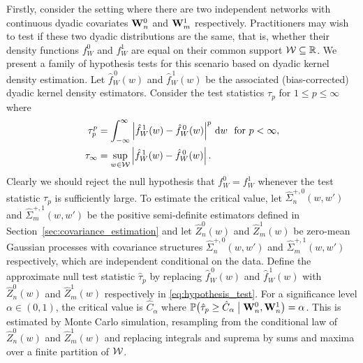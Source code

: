 Firstly, consider the setting where there are two independent networks with
continuous dyadic covariates $\mathbf{W}_n^0$ and $\mathbf{W}_m^1$ respectively.
Practitioners may wish to test if these two dyadic distributions are the same,
that is, whether their density functions $f_W^0$ and $f_W^1$ are equal on their
common support $\mathcal{W} \subseteq \mathbb{R}$. We present a family of hypothesis tests for
this scenario based on dyadic kernel density estimation. Let $\hat
f_W^{\,0}(w)$ and $\hat f_W^{\,1}(w)$ be the associated (bias-corrected) dyadic
kernel density estimators. Consider the test statistics $\tau_p$ for
$1 \leq p \leq \infty$ where
%
\begin{align}
  \nonumber
  \tau_p^p
  &= \int_{-\infty}^{\infty}
  \left| \hat f_W^{\,1}(w) - \hat f_W^{\,0}(w) \right|^p
  \,\mathrm{d}w
  \ \text{ for } p < \infty, \\
  \label{eq:hypothesis_test}
  \tau_\infty
  &= \sup_{w \in \mathcal{W}} \left| \hat f_W^{\,1}(w) - \hat f_W^{\,0}(w) \right|.
\end{align}
%
Clearly we should reject the null hypothesis that $f_W^0 = f_W^1$ whenever the
test statistic $\tau_p$ is sufficiently large. To estimate the critical value,
let $\hat\Sigma_n^{+,0}(w, w')$ and $\hat\Sigma_m^{+,1}(w, w')$ be the positive
semi-definite estimators defined in Section~\ref{sec:covariance_estimation} and
let $\hat Z^0_n(w)$ and $\hat Z^1_m(w)$ be zero-mean Gaussian processes with
covariance structures $\hat\Sigma_n^{+,0}(w, w')$ and
$\hat\Sigma_m^{+,1}(w, w')$ respectively, which are independent conditional on
the data. Define the approximate null test statistic $\hat \tau_p$ by replacing
$\hat f_W^{\,0}(w)$ and $\hat f_W^{\,1}(w)$ with $\hat Z^0_n(w)$ and
$\hat Z^1_m(w)$ respectively in \eqref{eq:hypothesis_test}.
For a significance level
$\alpha \in (0,1)$, the critical value is $\hat C_\alpha$ where
%
$\mathbb{P} \big(
  \hat \tau_p \geq \hat C_\alpha \bigm\vert \mathbf{W}_n^0, \mathbf{W}_n^1
\big) = \alpha$.
%
This is estimated by Monte Carlo simulation, resampling from the conditional
law of $\hat Z^0_n(w)$ and $\hat Z^1_m(w)$ and replacing integrals and suprema
by sums and maxima over a finite partition of $\mathcal{W}$.

